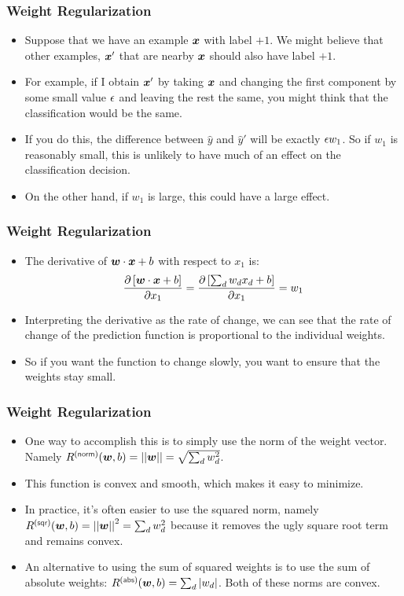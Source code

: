 \documentclass[trans]{beamer}
\begin{document}
\begin{frame}
  \frametitle{Weight Regularization}
\begin{itemize}
\item  Suppose that
we have an example ${\boldsymbol{x}}$ with label $+1$.  We might believe that other
examples, ${\boldsymbol{x}}'$ that are nearby ${\boldsymbol{x}}$ should also have label $+1$.
\item For example, if I obtain ${\boldsymbol{x}}'$ by taking ${\boldsymbol{x}}$ and changing the first
component by some small value $\epsilon$ and leaving the rest the same, you
might think that the classification would be the same.  
\item If you do
this, the difference between $\hat y$ and $\hat y'$ will be exactly
$\epsilon w_1$.  So if $w_1$ is reasonably small, this is unlikely to have
much of an effect on the classification decision. 
\item On the other hand,
if $w_1$ is large, this could have a large effect.
\end{itemize}
\end{frame}

\begin{frame}
  \frametitle{Weight Regularization}
\begin{itemize}
\item
 The derivative of
${\boldsymbol{w}} \cdot {\boldsymbol{x}}+b$ with respect to $x_1$ is:
\begin{equation}
\frac {\partial \left[{\boldsymbol{w}} \cdot {\boldsymbol{x}}+b\right]} {\partial x_1}
= \frac {\partial \left[\sum_d w_d x_d+b\right]} {\partial x_1}
= w_1
\end{equation}
\item Interpreting the derivative as the rate of change, we can see that the
rate of change of the prediction function is proportional to the
individual weights. 
\item So if you want the function to change slowly, you
want to ensure that the weights stay small.
\end{itemize}
\end{frame}

\begin{frame}
  \frametitle{Weight Regularization}
\begin{itemize}
\item
One way to accomplish this is to simply use the norm of the weight
vector.  Namely $R\xth{norm}(\vw,b) = \norm{\vw} = \sqrt{\sum_d
  w_d^2}$.  
  \item This function is convex and smooth, which makes it easy to
minimize. 
\item  In practice, it's often easier to use the squared norm,
namely $R\xth{sqr}(\vw,b) = \norm{\vw}^2 = \sum_d w_d^2$ because it
removes the ugly square root term and remains convex. 
\item  An alternative
to using the sum of squared weights is to use the sum of absolute
weights: $R\xth{abs}(\vw,b) = \sum_d \ab{w_d}$.  Both of these norms
are convex.
\end{itemize}
\end{frame}
\end{document}
